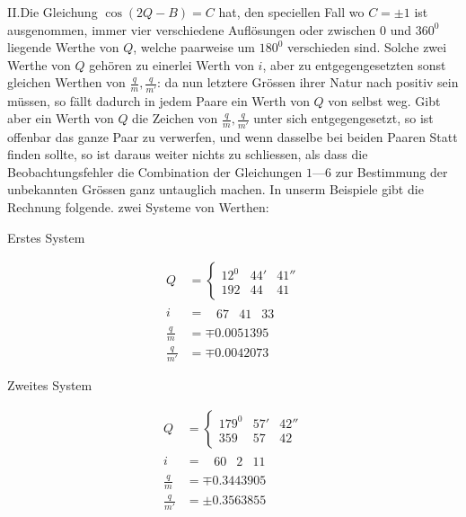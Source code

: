 II.\quad Die Gleichung $\cos(2Q-B)=C$ hat, den speciellen Fall wo $C=\pm1$ ist ausgenommen, immer vier verschiedene Auflösungen oder zwischen $0$ und $360^0$ liegende Werthe von $Q$, welche paarweise um $180^0$ verschieden sind. Solche zwei Werthe von $Q$ gehören zu einerlei Werth von $i$, aber zu entgegengesetzten sonst gleichen Werthen von $\frac{q}{m},\frac{q}{m'}$: da nun letztere Grössen ihrer Natur nach positiv sein müssen, so fällt dadurch in jedem Paare ein Werth von $Q$ von selbst weg. Gibt aber ein Werth von $Q$ die Zeichen von $\frac{q}{m},\frac{q}{m'}$ unter sich entgegengesetzt, so ist offenbar das ganze Paar zu verwerfen, und wenn dasselbe bei beiden Paaren Statt finden sollte, so ist daraus weiter nichts zu schliessen, als dass die Beobachtungsfehler die Combination der Gleichungen $1$---$6$ zur Bestimmung der unbekannten Grössen ganz untauglich machen. In unserm Beispiele gibt die Rechnung folgende. zwei Systeme von Werthen:
\begin{center}Erstes System\end{center}
\[
\begin{aligned}
Q&=\left\{\begin{array}{rrr}12^0&44'&41''\\192&44&41\end{array}\right.\\
i&=\phantom{\{}\begin{array}{rrr}67&41&33\end{array}\\
\frac{q}{m}&=\mp0.0051395\\
\frac{q}{m'}&=\mp0.0042073
\end{aligned}
\]
\begin{center}Zweites System\end{center}
\[
\begin{aligned}
Q&=\left\{\begin{array}{rrr}179^0&57'&42''\\359&57&42\end{array}\right.\\
i&=\phantom{\{}\begin{array}{rrr}60&2&11\end{array}\\
\frac{q}{m}&=\mp0.3443905\\
\frac{q}{m'}&=\pm0.3563855
\end{aligned}
\]


